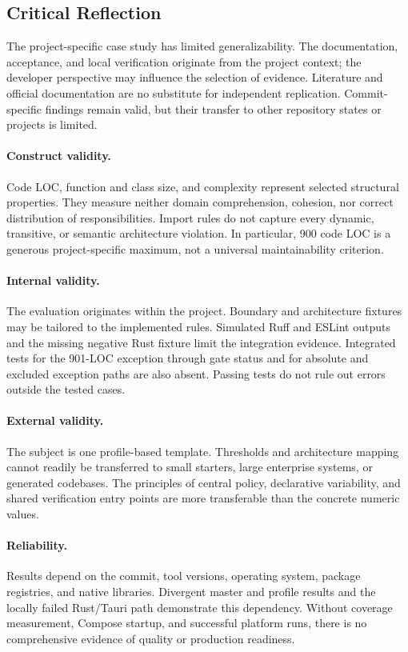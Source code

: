 \subsection{Critical Reflection}
\label{subsec:kritische-wuerdigung}

The project-specific case study has limited generalizability. The
documentation, acceptance, and local verification originate from the project
context; the developer perspective may influence the selection of evidence.
Literature and official documentation are no substitute for independent
replication. Commit-specific findings remain valid, but their transfer to
other repository states or projects is limited.

\paragraph{Construct validity.}
Code LOC, function and class size, and complexity represent selected structural
properties. They measure neither domain comprehension, cohesion, nor correct
distribution of responsibilities. Import rules do not capture every dynamic,
transitive, or semantic architecture violation. In particular, 900 code LOC
is a generous project-specific maximum, not a universal maintainability
criterion.

\paragraph{Internal validity.}
The evaluation originates within the project. Boundary and architecture
fixtures may be tailored to the implemented rules. Simulated Ruff and ESLint
outputs and the missing negative Rust fixture limit the integration evidence.
Integrated tests for the 901-LOC exception through gate status and for absolute
and excluded exception paths are also absent. Passing tests do not rule out
errors outside the tested cases.

\paragraph{External validity.}
The subject is one profile-based template. Thresholds and architecture mapping
cannot readily be transferred to small starters, large enterprise systems, or
generated codebases. The principles of central policy, declarative variability,
and shared verification entry points are more transferable than the concrete
numeric values.

\paragraph{Reliability.}
Results depend on the commit, tool versions, operating system, package
registries, and native libraries. Divergent master and profile results and the
locally failed Rust/Tauri path demonstrate this dependency. Without coverage
measurement, Compose startup, and successful platform runs, there is no
comprehensive evidence of quality or production readiness.

